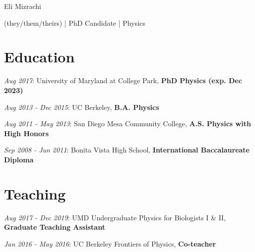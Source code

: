 \documentclass[
  10pt,
  letterpaper,
  DIV=11,
  numbers=noendperiod]{scrartcl}
\author{}
\date{}
\begin{document}
\ifdefined\Shaded\renewenvironment{Shaded}{\begin{tcolorbox}[sharp corners, frame hidden, borderline west={3pt}{0pt}{shadecolor}, interior hidden, boxrule=0pt, enhanced, breakable]}{\end{tcolorbox}}\fi

\begin{center}

\begin{LARGE}Eli Mizrachi\end{LARGE}

\begin{small}(they/them/theirs) | PhD Candidate | Physics\end{small}

\href{mailto:emiz@umd.edu}{}
\href{https://e-miz.github.io}{}

\end{center}

\hypertarget{fa-user-graduate-education}{%
\section{\texorpdfstring{
Education}{ Education}}\label{fa-user-graduate-education}}

\textcolor{mygray}{\textit{Aug 2017}}: University of Maryland at College
Park, \textbf{PhD Physics (exp. Dec 2023)}

\textcolor{mygray}{\textit{Aug 2013 - Dec 2015}}: UC Berkeley,
\textbf{B.A. Physics}

\textcolor{mygray}{\textit{Aug 2011 - May 2013}}: San Diego Mesa
Community College, \textbf{A.S. Physics with High Honors}

\textcolor{mygray}{\textit{Sep 2008 - Jun 2011}}: Bonita Vista High
School, \textbf{International Baccalaureate Diploma}

\hypertarget{fa-school-teaching}{%
\section{\texorpdfstring{
Teaching}{ Teaching}}\label{fa-school-teaching}}

\textcolor{mygray}{\textit{Aug 2017 - Dec 2019}}: UMD Undergraduate
Physics for Biologists I \& II, \textbf{Graduate Teaching Assistant}

\textcolor{mygray}{\textit{Jan 2016 - May 2016}}: UC Berkeley Frontiers
of Physics, \textbf{Co-teacher}
\end{document}
